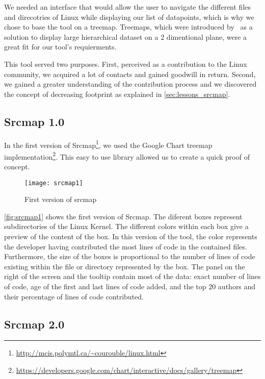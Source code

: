 We needed an interface that would allow the user to navigate the different files and direcotries of Linux while displaying our list of datapoints, which is why we chose to base the tool on a treemap. Treemaps, which were introduced by~\citep{Bederson-2002} as a solution to display large hierarchical dataset on a 2 dimentional plane, were a great fit for our tool's requierments. 

This tool served two purposes. First, perceived as a contribution to the Linux community, we acquired a lot of contacts and gained goodwill in return. Second, we gained a greater understanding of the contribution process and we discovered the concept of decreasing footprint as explained in \autoref{sec:lessons_srcmap}.

\subsection{Srcmap 1.0}

In the first version of Srcmap\footnote{\url{http://mcis.polymtl.ca/~courouble/linux.html}}, we used the Google Chart treemap implementation\footnote{\url{https://developers.google.com/chart/interactive/docs/gallery/treemap}}. This easy to use library allowed us to create a quick proof of concept. 

\begin{figure}[htb]
\centering
\texttt{[image: srcmap1]}
\caption{First version of srcmap}
\label{fig:srcmap1}
\end{figure}

\autoref{fig:srcmap1} shows the first version of Srcmap. The diferent boxes represent subdirectories of the Linux Kernel. The different colors within each box give a preview of the content of the box. In this version of the tool, the color represents the developer having contributed the most lines of code in the contained files. Furthermore, the size of the boxes is proportional to the number of lines of code existing within the file or directory represented by the box. The panel on the right of the screen and the tooltip contain most of the data: exact number of lines of code, age of the first and last lines of code added, and the top 20 authors and their percentage of lines of code contributed.


\subsection{Srcmap 2.0}


